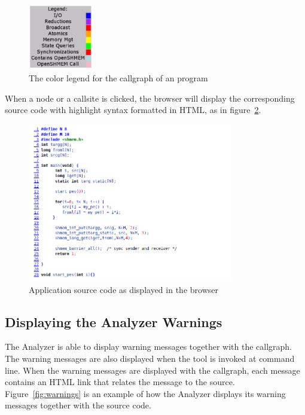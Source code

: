 \begin{figure}[!ht]
  \begin{center}
    \includegraphics[width=0.25\textwidth]{./osa_color_legend}
    \caption{The color legend for the callgraph of an \openshmem program}
    \label{fig:colors}
  \end{center}
\end{figure}

When a node or a callsite is clicked, the browser will display the
corresponding source code with highlight syntax formatted in HTML, as
in figure~\ref{fig:app-source}.

\vspace{0.1in}

\begin{figure}[!ht]
  \begin{center}
    \includegraphics[width=0.8\textwidth]{./source_listing_test_bounds}
    \caption{Application source code as displayed in the browser}
    \label{fig:app-source}
  \end{center}
\end{figure}

\subsection{Displaying the \openshmem Analyzer Warnings}

The \openshmem Analyzer is able to display \openshmem warning messages
together with the callgraph. The warning messages are also displayed
when the tool is invoked at command line. When the warning messages
are displayed with the callgraph, each message contains an HTML link
that relates the message to the source. Figure~\ref{fig:warnings} is
an example of how the \openshmem Analyzer displays its warning messages
together with the source code.

